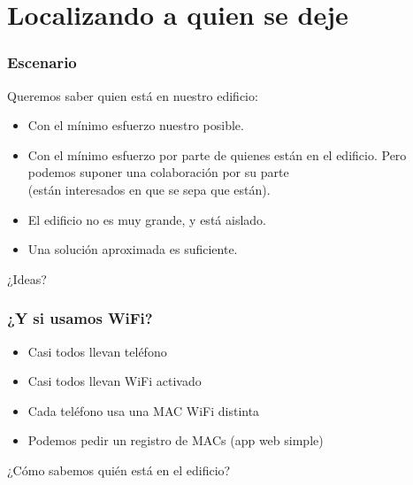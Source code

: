 %
%

\section{Localizando a quien se deje}

\begin{frame}
\frametitle{Escenario}

{\Large
Queremos saber quien está en nuestro edificio:

\begin{itemize}
\item Con el mínimo esfuerzo nuestro posible.
\item Con el mínimo esfuerzo por parte de quienes están en el edificio.
\itme Pero podemos suponer una colaboración por su parte \\
(están interesados en que se sepa que están).
\item El edificio no es muy grande, y está aislado.
\item Una solución aproximada es suficiente.
\end{itemize}
}

{\huge
\begin{center}
¿Ideas?
\end{center}
}
\end{frame}

\begin{frame}
\frametitle{¿Y si usamos WiFi?}

{\Large
\begin{itemize}
\item Casi todos llevan teléfono
\item Casi todos llevan WiFi activado
\item Cada teléfono usa una MAC WiFi distinta
\item Podemos pedir un registro de MACs (app web simple)
\end{itemize}
}

\vspace{1cm}

{\huge
\begin{center}
¿Cómo sabemos quién está en el edificio?
\end{center}
}

\end{frame}

